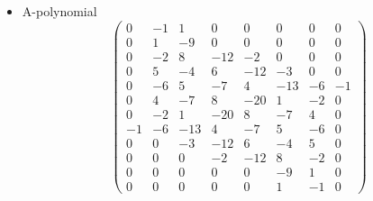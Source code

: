 \documentclass[12pt,reqno]{amsart}
\numberwithin{equation}{section}
\begin{document}
\begin{itemize}
\item A-polynomial
\begin{equation*}
  \begin{pmatrix}
    0 & -1 & 1 & 0 & 0 & 0 & 0 & 0 \\
    0 & 1 & -9 & 0 & 0 & 0 & 0 & 0 \\
    0 & -2 & 8 & -12 & -2 & 0 & 0 & 0 \\
    0 & 5 & -4 & 6 & -12 & -3 & 0 & 0 \\
    0 & -6 & 5 & -7 & 4 & -13 & -6 & -1 \\
    0 & 4 & -7 & 8 & -20 & 1 & -2 & 0 \\
    0 & -2 & 1 & -20 & 8 & -7 & 4 & 0 \\
    -1 & -6 & -13 & 4 & -7 & 5 & -6 & 0 \\
    0 & 0 & -3 & -12 & 6 & -4 & 5 & 0 \\
    0 & 0 & 0 & -2 & -12 & 8 & -2 & 0 \\
    0 & 0 & 0 & 0 & 0 & -9 & 1 & 0 \\
    0 & 0 & 0 & 0 & 0 & 1 & -1 & 0 
  \end{pmatrix}
\end{equation*}
\end{itemize}



%
%

%
%
%
%
\end{document}
